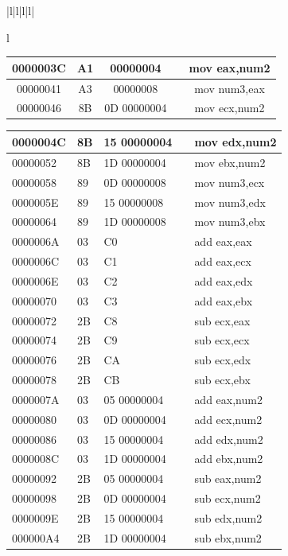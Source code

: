 \documentclass[10pt]{book}
\begin{document}
\begin{center}
\begin{tabular}{|l|l|l|l|}
\begin{tabular}{l}
\begin{center}
\begin{tabular}{|c|c|c|c|c|}
\hline
0000003C & A1 & 00000004 &  & mov eax,num2 \\
\hline
00000041 & A3 & 00000008 &  & mov num3,eax \\
\hline
00000046 & 8B & 0D 00000004 &  & mov ecx,num2 \\
\hline
\end{tabular}
\end{center}
\begin{center}
\begin{tabular}{|l|l|l|l|l|}
\hline
0000004C & 8B & 15 00000004 &  & mov edx,num2 \\
\hline
00000052 & 8B & 1D 00000004 &  & mov ebx,num2 \\
\hline
00000058 & 89 & 0D 00000008 &  & mov num3,ecx \\
\hline
0000005E & 89 & 15 00000008 &  & mov num3,edx \\
\hline
00000064 & 89 & 1D 00000008 &  & mov num3,ebx \\
\hline
0000006A & 03 & C0 &  & add eax,eax \\
\hline
0000006C & 03 & C1 &  & add eax,ecx \\
\hline
0000006E & 03 & C2 &  & add eax,edx \\
\hline
00000070 & 03 & C3 &  & add eax,ebx \\
\hline
00000072 & 2B & C8 &  & sub ecx,eax \\
\hline
00000074 & 2B & C9 &  & sub ecx,ecx \\
\hline
00000076 & 2B & CA &  & sub ecx,edx \\
\hline
00000078 & 2B & CB &  & sub ecx,ebx \\
\hline
0000007A & 03 & 05 00000004 &  & add eax,num2 \\
\hline
00000080 & 03 & 0D 00000004 &  & add ecx,num2 \\
\hline
00000086 & 03 & 15 00000004 &  & add edx,num2 \\
\hline
0000008C & 03 & 1D 00000004 &  & add ebx,num2 \\
\hline
00000092 & 2B & 05 00000004 &  & sub eax,num2 \\
\hline
00000098 & 2B & 0D 00000004 &  & sub ecx,num2 \\
\hline
0000009E & 2B & 15 00000004 &  & sub edx,num2 \\
\hline
000000A4 & 2B & 1D 00000004 &  & sub ebx,num2 \\

\end{tabular}
\end{center}
\end{tabular}
\end{tabular}
\end{center}
\end{document}
